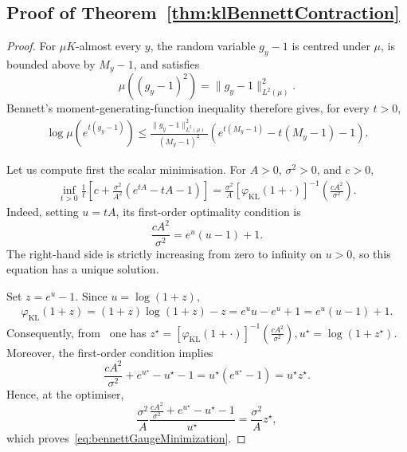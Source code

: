\documentclass[11pt]{article}
\theoremstyle{plain}
\theoremstyle{remark}
\begin{document}
\subsection{Proof of Theorem~\ref{thm:klBennettContraction}}\label{app:proofKLBennettContraction}
\begin{proof}
For $\mu K$-almost every $y$, the random variable $g_y-1$ is centred
under $\mu$, is bounded above by $M_y-1$, and satisfies
\begin{equation}
    \mu\left((g_y-1)^2\right)
    =
    \lVert g_y-1\rVert_{L^2(\mu)}^2.
\end{equation}
Bennett's moment-generating-function inequality therefore gives, for
every $t>0$,
\begin{align}
\log\mu\left(e^{t(g_y-1)}\right)
\leq
\frac{
    \lVert g_y-1\rVert_{L^2(\mu)}^2
}{
    (M_y-1)^2
}
\left(
    e^{t(M_y-1)}
    -
    t(M_y-1)
    -
    1
\right).
\label{eq:klPositiveMGFBennett}
\end{align}

Let us compute first the scalar minimisation. For
$A>0$, $\sigma^2>0$, and $c>0$,
\begin{align}
\inf_{t>0}
\frac{1}{t}
\left[
c+
\frac{\sigma^2}{A^2}
\left(
    e^{tA}-tA-1
\right)
\right]
=
\frac{\sigma^2}{A}
\left[
    \varphi_{\mathrm{KL}}(1+\cdot)
\right]^{-1}
\left(
    \frac{cA^2}{\sigma^2}
\right).
\label{eq:bennettGaugeMinimization}
\end{align}
Indeed, setting $u = tA$, its first-order optimality condition is
\begin{equation}
\frac{cA^2}{\sigma^2}=e^u(u-1)+1.
\label{eq:bennettOptimalityCondition}
\end{equation}
The right-hand side is strictly increasing from zero to infinity
on $u>0$, so this equation has a unique solution.

Set $z=e^u-1$. Since $u=\log(1+z)$,
\begin{align}
\varphi_{\mathrm{KL}}(1+z)
=
(1+z)\log(1+z)-z =
e^u u-e^u+1 =
e^u(u-1)+1.
\end{align}
Consequently, from~ one has $
z^\star
=
\left[
    \varphi_{\mathrm{KL}}(1+\cdot)
\right]^{-1}
\left(
    \frac{cA^2}{\sigma^2}
\right), u^\star = \log(1+z^\star).$
Moreover, the first-order condition implies
\[
\frac{cA^2}{\sigma^2}+e^{u^\star}-u^\star-1
=
u^\star(e^{u^\star}-1)
=
u^\star z^\star.
\]
Hence, at the optimiser,
\[
\frac{\sigma^2}{A}
\frac{
\frac{cA^2}{\sigma^2}+e^{u^\star}-u^\star-1
}{
u^\star
}
=
\frac{\sigma^2}{A}z^\star,
\]
which proves~\eqref{eq:bennettGaugeMinimization}.


\end{proof}
\end{document}
